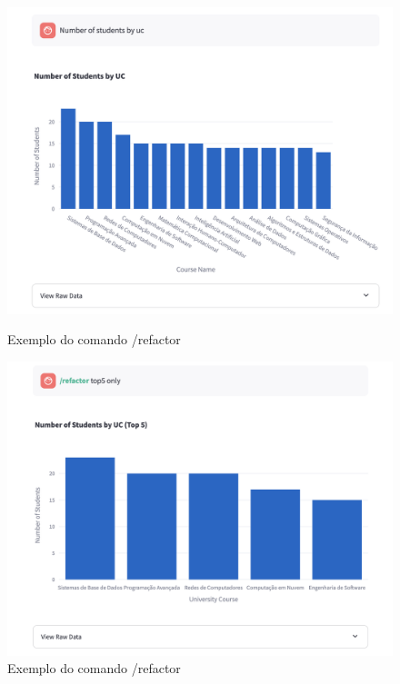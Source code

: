 \documentclass{article}
\begin{document}
\begin{figure}[!h]
    \begin{minipage}{0.46\linewidth}
        \centering
        \includegraphics[width=\linewidth]{images/:refactor0.png}
        \caption{Exemplo do comando /refactor}
        \label{fig:sql}
    \end{minipage}
    \hspace{0.01\linewidth} %
    \begin{minipage}{0.46\linewidth}
        \centering
        \includegraphics[width=\linewidth]{images/:refactor.png}
        \caption{Exemplo do comando /refactor}
        \label{fig:tables}
    \end{minipage}
\end{figure}
\end{document}
